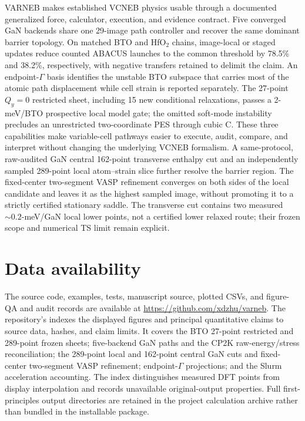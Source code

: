 \documentclass[final,5p,times,twocolumn]{elsarticle}
\begin{document}
VARNEB makes established VCNEB physics usable through a documented generalized
force, calculator, execution, and evidence contract. Five converged GaN
backends share one 29-image path controller and recover the same dominant
barrier topology. On matched BTO and HfO$_2$ chains, image-local or staged updates
reduce counted ABACUS launches to the common threshold by 78.5\% and 38.2\%,
respectively, with
negative transfers retained to delimit the claim. An endpoint-$\Gamma$ basis
identifies the unstable BTO subspace that carries most of the atomic path
displacement while cell strain is reported separately. The 27-point
$Q_y=0$ restricted sheet, including 15 new conditional relaxations, passes
a 2-meV/BTO prospective local model gate;
the omitted soft-mode instability precludes an unrestricted two-coordinate
PES through cubic C. These three capabilities
make variable-cell pathways easier to execute, audit, compare, and interpret
without changing the underlying VCNEB formalism. A same-protocol, raw-audited
GaN central 162-point transverse enthalpy cut and an independently sampled
289-point local atom--strain slice further resolve the barrier region. The
fixed-center two-segment VASP refinement converges on both sides of the local
candidate and leaves it as the highest sampled image, without promoting it to
a strictly certified stationary saddle. The
transverse cut contains two measured $\sim0.2$-meV/GaN local lower points,
not a certified lower relaxed route;
their frozen scope and numerical TS limit remain explicit.

\section*{Data availability}

The source code, examples, tests, manuscript source, plotted CSVs, and
figure-QA and audit records are available at
\url{https://github.com/xdzhu/varneb}. The repository's
 indexes the displayed figures
and principal quantitative claims to source data, hashes, and claim limits.
It covers the BTO 27-point restricted and 289-point frozen sheets; five-backend GaN
paths and the CP2K raw-energy/stress reconciliation; the 289-point local and
162-point central GaN cuts and fixed-center two-segment VASP refinement;
endpoint-$\Gamma$ projections; and the Slurm
acceleration accounting. The index distinguishes measured DFT points from
display interpolation and records unavailable original-output properties.
Full first-principles output directories are retained in the project
calculation archive rather than bundled in the installable package.
\end{document}
